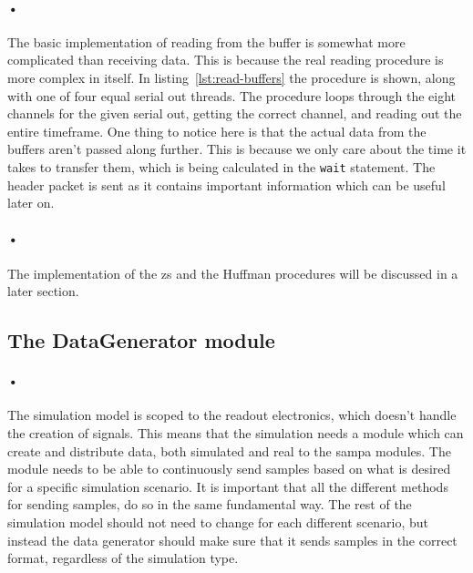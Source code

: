 \documentclass[a4paper, 12pt]{report}
\newcommand{\codeword}[1]{\texttt{#1}}
\begin{document}
\paragraph{•}
The basic implementation of reading from the buffer is somewhat more complicated than receiving data.
This is because the real reading procedure is more complex in itself.
In listing~\ref{lst:read-buffers} the procedure is shown, along with one of four equal serial out threads.
The procedure loops through the eight channels for the given serial out, getting the correct channel, and reading out the entire timeframe.
One thing to notice here is that the actual data from the buffers aren't passed along further.
This is because we only care about the time it takes to transfer them, which is being calculated in the \codeword{wait} statement.
The header packet is sent as it contains important information which can be useful later on.

\begin{minipage}{\linewidth}

\end{minipage}

\paragraph{•}
The implementation of the \gls{zs} and the Huffman procedures will be discussed in a later section.

\subsection{The DataGenerator module}
\paragraph{•}
The simulation model is scoped to the readout electronics, which doesn't handle the creation of signals.
This means that the simulation needs a module which can create and distribute data, both simulated and real to the \gls{sampa} modules.
The module needs to be able to continuously send samples based on what is desired for a specific simulation scenario.
It is important that all the different methods for sending samples, do so in the same fundamental way.
The rest of the simulation model should not need to change for each different scenario, but instead the data generator should make sure that it sends samples in the correct format, regardless of the simulation type.
\end{document}

